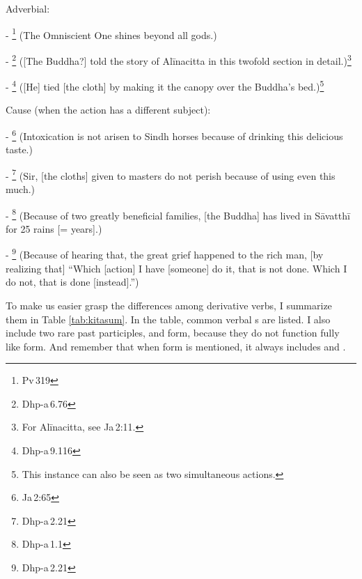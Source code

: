 \begin{compactenum}[(1)]
\item Adverbial:\par
- \footnote{Pv\,319} (The Omniscient One shines beyond all gods.)\par
- \footnote{Dhp-a\,6.76} ([The Buddha?] told the story of Al\=inacitta in this twofold section in detail.)\footnote{For Al\=inacitta, see Ja\,2:11.}\par
- \footnote{Dhp-a\,9.116} ([He] tied [the cloth] by making it the canopy over the Buddha's bed.)\footnote{This instance can also be seen as two simultaneous actions.}\par

\item Cause (when the action has a different subject):\par
- \footnote{Ja\,2:65} (Intoxication is not arisen to Sindh horses because of drinking this delicious taste.)\par
- \footnote{Dhp-a\,2.21} (Sir, [the cloths] given to masters do not perish because of using even this much.)\par
- \footnote{Dhp-a\,1.1} (Because of two greatly beneficial families, [the Buddha] has lived in S\=avatth\=i for 25 rains [= years].)\par
- \footnote{Dhp-a\,2.21} (Because of hearing that, the great grief happened to the rich man, [by realizing that] ``Which [action] I have [someone] do it, that is not done. Which I do not, that is done [instead].'')\par
\end{compactenum}

\bigskip
To make us easier grasp the differences among derivative verbs, I summarize them in Table \ref{tab:kitasum}. In the table, common verbal s are listed. I also include two rare past participles,  and  form, because they do not function fully like  form. And remember that when  form is mentioned, it always includes  and .

